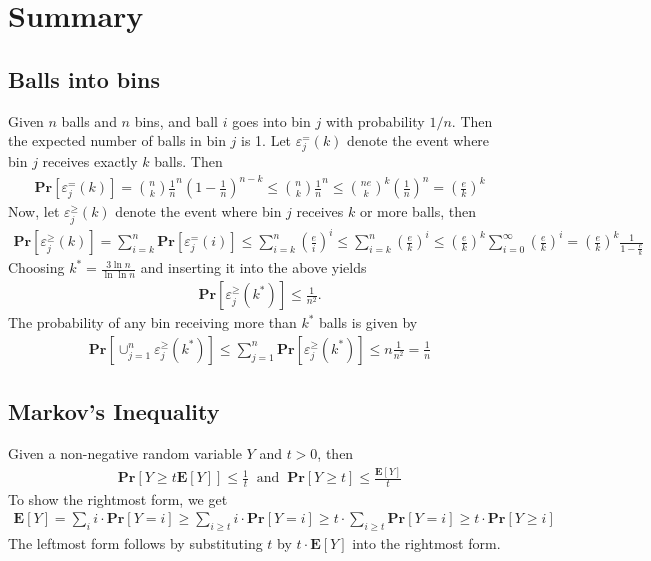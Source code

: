 \documentclass[12pt]{article}
\begin{document}
\pagebreak

\section*{Summary}
\subsection*{Balls into bins}
Given $n$ balls and $n$ bins, and ball $i$ goes into bin $j$ with probability $1/n$. Then the expected number of balls in bin $j$ is 1. Let $\varepsilon^=_j(k)$ denote the event where bin $j$ receives exactly $k$ balls. Then
\begin{align*}
\mathbf{Pr}\left[ \varepsilon^=_j(k) \right] = \binom{n}{k}\frac{1}{n}^n \left( 1-\frac{1}{n} \right)^{n-k} \leq \binom{n}{k}\frac{1}{n}^n \leq \binom{ne}{k}^k \left( \frac{1}{n} \right)^n = \left(\frac{e}{k}\right)^k 
\end{align*}
Now, let $\varepsilon^\geq_j(k)$ denote the event where bin $j$ receives $k$ or more balls, then
\begin{align*}
\mathbf{Pr}\left[ \varepsilon^\geq_j(k) \right] = \sum_{i=k}^{n} \mathbf{Pr}\left[ \varepsilon^=_j(i) \right] \leq \sum_{i=k}^{n} \left(\frac{e}{i}\right)^i \leq \sum_{i=k}^{n} \left(\frac{e}{k}\right)^i \leq \left(\frac{e}{k}\right)^k \sum_{i=0}^{\infty} \left( \frac{e}{k} \right)^i = \left( \frac{e}{k} \right)^k \frac{1}{1-\frac{e}{k}}
\end{align*}
Choosing $k^*=\frac{3 \ln n}{\ln \ln n}$ and inserting it into the above yields
\begin{align*}
\mathbf{Pr}\left[ \varepsilon_j^\geq(k^*) \right] \leq \frac{1}{n^2}.
\end{align*}
The probability of any bin receiving more than $k^*$ balls is given by
\begin{align*}
\mathbf{Pr}\left[ \cup_{j=1}^{n} \varepsilon_j^\geq(k^*) \right] \leq \sum_{j=1}^n \mathbf{Pr}\left[ \varepsilon_j^\geq(k^*) \right] \leq n \frac{1}{n^2} = \frac{1}{n}
\end{align*}

\subsection*{Markov's Inequality}
Given a non-negative random variable $Y$ and $t > 0$, then
\begin{align*}
\mathbf{Pr}\left[ Y \geq t \mathbf{E}\left[ Y \right] \right] \leq \frac{1}{t} \;\; \mathrm{ and } \;\; \mathbf{Pr}\left[ Y \geq t \right] \leq \frac{\mathbf{E}\left[ Y \right]}{t}
\end{align*}
To show the rightmost form, we get
\begin{align*}
\mathbf{E}\left[ Y \right] = \sum_{i} i \cdot \mathbf{Pr}\left[ Y=i \right] \geq \sum_{i \geq t} i \cdot \mathbf{Pr}\left[ Y=i \right] \geq t \cdot \sum_{i \geq t} \mathbf{Pr}\left[ Y=i \right] \geq t \cdot \mathbf{Pr}\left[ Y \geq i \right] 
\end{align*}
The leftmost form follows by substituting $t$ by $t \cdot \mathbf{E}\left[ Y \right]$ into the rightmost form.
\end{document}
